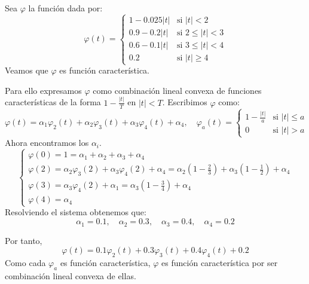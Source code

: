 \begin{exercise}
    Sea $\varphi$ la función dada por:
    $$\varphi(t) = \begin{cases}
            1 - 0.025|t| & \text{si } |t| < 2        \\
            0.9 - 0.2|t| & \text{si } 2 \leq |t| < 3 \\
            0.6 - 0.1|t| & \text{si } 3 \leq |t| < 4 \\
            0.2          & \text{si } |t| \geq 4
        \end{cases}$$
    Veamos que $\varphi$ es función característica.

    Para ello expresamos $\varphi$ como combinación lineal convexa de funciones características de la forma $1 - \frac{|t|}{T}$ en $|t| < T$.
    Escribimos $\varphi$ como:
    $$\varphi(t) = \alpha_1\varphi_2(t) + \alpha_2\varphi_3(t) + \alpha_3\varphi_4(t) + \alpha_4, \quad \varphi_a(t) = \begin{cases}
            1 - \frac{|t|}{a} & \text{si } |t| \leq a \\
            0                 & \text{si } |t| > a
        \end{cases}$$
    Ahora encontramos los $\alpha_i$.
    $$\begin{cases}
            \varphi(0) = 1 = \alpha_1 + \alpha_2 + \alpha_3 + \alpha_4                                                                                               \\
            \varphi(2) = \alpha_2\varphi_3(2) + \alpha_3\varphi_4(2) + \alpha_4 = \alpha_2\left(1-\frac{2}{3}\right) + \alpha_3\left(1-\frac{1}{2}\right) + \alpha_4 \\
            \varphi(3) = \alpha_3\varphi_4(2) + \alpha_1 = \alpha_3\left(1-\frac{3}{4}\right) + \alpha_4                                                             \\
            \varphi(4) = \alpha_4
        \end{cases}$$
    Resolviendo el sistema obtenemos que:
    $$\alpha_1 = 0.1, \quad \alpha_2 = 0.3, \quad \alpha_3 = 0.4, \quad \alpha_4 = 0.2$$

    Por tanto,
    $$\varphi(t) = 0.1\varphi_2(t) + 0.3\varphi_3(t) + 0.4\varphi_4(t) + 0.2$$
    Como cada $\varphi_a$ es función característica, $\varphi$ es función característica por ser combinación lineal convexa de ellas.
\end{exercise}